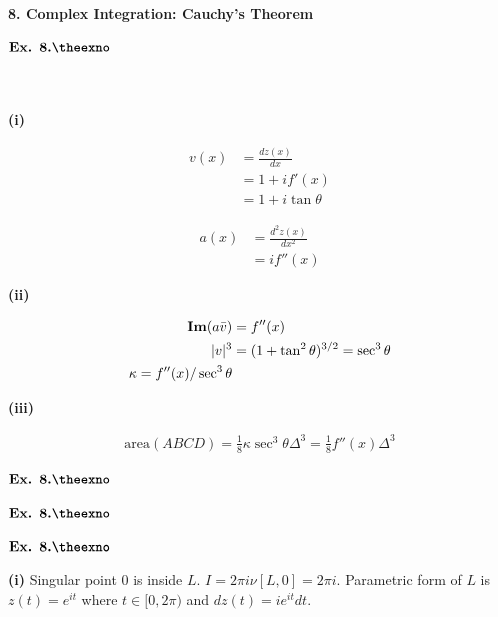 \documentclass{article}
\def\tf{\textbf}
\def\mf{\ensuremath\mathbf}
\def\Im{\ensuremath\mf{Im}}
\newcounter{exno}
\begin{document}
\vspace{0.2in}


\clearpage
\setcounter{exno}{1}

\begin{center}
    \textbf{\large{8. Complex Integration: Cauchy's Theorem}}
\end{center}

${\textbf{Ex. 8.\theexno}}$\addtocounter{exno}{1}\\~\\
\tf{(i)}

\begin{align*}
    v(x) &= \frac{dz(x)}{dx}\\
    &= 1 + if'(x)\\
    &= 1 + i\tan\theta
\end{align*}

\begin{align*}
    a(x) &= \frac{d^2z(x)}{dx^2}\\
    &= if''(x)
\end{align*}

\tf{(ii)}

\begin{align*}
    \Im(a\bar{v}) &= f''(x)\\
    |v|^{3} &= (1+\tan^2\theta)^{3/2} = \sec^3\theta\\
    \kappa = f''(x)/\sec^3\theta
\end{align*}

\tf{(iii)}

\begin{align*}
    \text{area}(ABCD) = \frac{1}{8}\kappa\sec^3\theta \Delta^3 = \frac{1}{8}f''(x)\Delta^3
\end{align*}

\vspace{0.2in}

${\textbf{Ex. 8.\theexno}}$\addtocounter{exno}{1}

\vspace{0.2in}

${\textbf{Ex. 8.\theexno}}$\addtocounter{exno}{1}

\vspace{0.2in}

${\textbf{Ex. 8.\theexno}}$\addtocounter{exno}{1}
\tf{(i)} Singular point $0$ is inside $L$. $I=2\pi i\nu[L,0] = 2\pi i$. Parametric form of $L$ is $z(t) = e^{it}$ where $t \in [0,2\pi)$ and $dz(t) = ie^{it}dt$.
\end{document}
